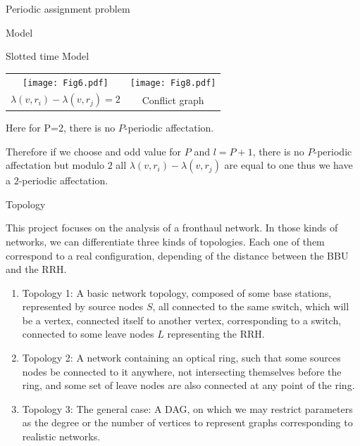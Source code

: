 \documentclass[a4paper,10pt]{report}
\begin{document}
\begin{chapter}{Periodic assignment problem}
\begin{section}{Model}
\begin{subsection}{Slotted time Model}
{{\begin{tabular}{cc}
\texttt{[image: Fig6.pdf]} & \texttt{[image: Fig8.pdf]}\\
 $\lambda(v,r_i) - \lambda(v,r_j)=2$ & Conflict graph\\
\end{tabular}\newline
\begin{center}
 Here for P=2, there is no $P$-periodic affectation.
\end{center}

Therefore if we choose and odd value for $P$ and $l=P+1$, there is no $P$-periodic affectation but modulo $2$ all $\lambda(v,r_i) - \lambda(v,r_j)$
are equal to one thus we have a $2$-periodic affectation. 
}}
\end{subsection}
\begin{subsection}{Topology}

This project focuses on the analysis of a fronthaul network. In those kinds of networks, we can differentiate three kinds of
topologies. Each one of them correspond to a real configuration, depending of the distance between the BBU and the RRH.
\begin{enumerate}
 \item Topology 1: A basic network topology, composed of some base stations, represented by source nodes $S$, all connected to the same switch,
which will be a vertex, connected itself to another vertex, corresponding to a switch, connected to some leave nodes $L$ representing the RRH.
\item Topology 2: A network containing an optical ring, such that some sources nodes be connected to it anywhere, not intersecting themselves before the ring,
and some set of leave nodes are also connected at any point of the ring.
\item Topology 3: The general case: A DAG, on which we may restrict parameters as the degree or the number of vertices to represent graphs corresponding to realistic networks.
\end{enumerate}
\fbox{\parbox{12cm}{
\begin{figure}[H]

\begin{center}
 

\end{center}
\end{figure}}}
\end{subsection}
\end{section}
\end{chapter}
\end{document}
